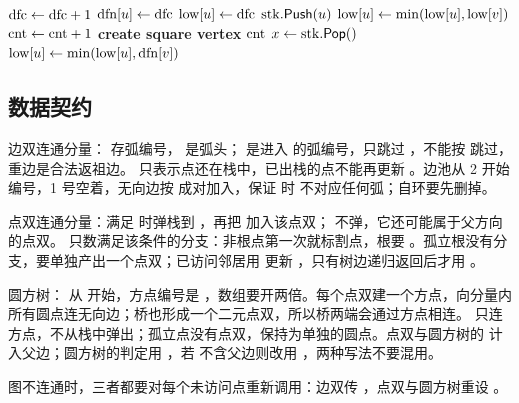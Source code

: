 \begin{algorithm}[H]
    \caption{圆方树}
    \begin{algorithmic}[1]
            \State $\pvar{dfc} \gets \pvar{dfc} + 1$
            \State $\pvar{dfn}[u] \gets \pvar{dfc}$
            \State $\pvar{low}[u] \gets \pvar{dfc}$
            \State $\pvar{stk}.\Call{Push}{u}$
                    \State {}
                    \State $\pvar{low}[u] \gets \min(\pvar{low}[u], \pvar{low}[v])$
                        \State $\pvar{cnt} \gets \pvar{cnt} + 1$
                        \State \textbf{create square vertex} $\pvar{cnt}$
                        \Repeat
                            \State $x \gets \pvar{stk}.\Call{Pop}{}$
                            \State {}
                        \State {}
                    \EndIf
                \Else
                    \State $\pvar{low}[u] \gets \min(\pvar{low}[u], \pvar{dfn}[v])$
                \EndIf
            \EndFor
        \EndProcedure
    \end{algorithmic}
\end{algorithm}

\subsection{数据契约}\label{sec:tarjan-contract}

边双连通分量： 存弧编号， 是弧头； 是进入  的弧编号，只跳过 ，不能按  跳过，重边是合法返祖边。 只表示点还在栈中，已出栈的点不能再更新 。边池从 2 开始编号，1 号空着，无向边按  成对加入，保证  时  不对应任何弧；自环要先删掉。

点双连通分量：满足  时弹栈到 ，再把  加入该点双； 不弹，它还可能属于父方向的点双。 只数满足该条件的分支：非根点第一次就标割点，根要 。孤立根没有分支，要单独产出一个点双；已访问邻居用  更新 ，只有树边递归返回后才用 。

圆方树： 从  开始，方点编号是 ，数组要开两倍。每个点双建一个方点，向分量内所有圆点连无向边；桥也形成一个二元点双，所以桥两端会通过方点相连。 只连方点，不从栈中弹出；孤立点没有点双，保持为单独的圆点。点双与圆方树的  计入父边；圆方树的判定用 ，若  不含父边则改用 ，两种写法不要混用。

图不连通时，三者都要对每个未访问点重新调用：边双传 ，点双与圆方树重设 。
